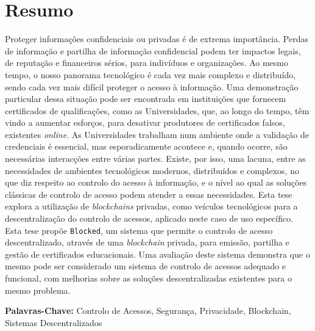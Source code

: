 \section*{Resumo}

Proteger informações confidenciais ou privadas é de extrema importância. Perdas de informação e partilha de informação confidencial podem ter impactos legais, de reputação e financeiros sérios, para indivíduos e organizações. Ao mesmo tempo, o nosso panorama tecnológico é cada vez mais complexo e distribuído, sendo cada vez mais difícil proteger o acesso à informação. Uma demonstração particular dessa situação pode ser encontrada em instituições que fornecem certificados de qualificações, como as Universidades, que, ao longo do tempo, têm vindo a aumentar esforços, para desativar produtores de certificados falsos, existentes \emph{online}. As Universidades trabalham num ambiente onde a validação de credenciais é essencial, mas esporadicamente acontece e, quando ocorre, são necessárias interacções entre várias partes. Existe, por isso, uma lacuna, entre as necessidades de ambientes tecnológicos modernos, distribuídos e complexos, no que diz respeito ao controlo do acesso à informação, e o nível ao qual as soluções clássicas de controlo de acesso podem atender a essas necessidades. Esta tese explora a utilização de \emph{blockchains} privadas, como veículos tecnológicos para a descentralização do controlo de acessos, aplicado neste caso de uso específico. Esta tese propõe \texttt{Blocked}, um sistema que permite o controlo de acesso descentralizado, através de uma \emph{blockchain} privada, para emissão, partilha e gestão de certificados educacionais. Uma avaliação deste sistema demonstra que o mesmo pode ser considerado um sistema de controlo de acessos adequado e funcional, com melhorias sobre as soluções descentralizadas existentes para o mesmo problema.

\vfill

\noindent \textbf{Palavras-Chave:} Controlo de Acessos, Segurança, Privacidade, Blockchain, Sistemas Descentralizados 